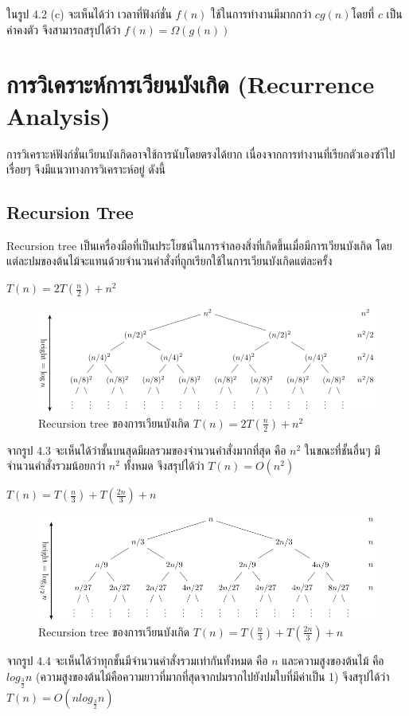 ในรูป 4.2 (c) จะเห็นได้ว่า เวลาที่ฟังก์ชั่น $f(n)$ ใช้ในการทำงานมีมากกว่า $cg(n)$โดยที่ $c$ เป็นค่าคงตัว จึงสามารถสรุปได้ว่า $f(n)=\Omega(g(n))$

\section{การวิเคราะห์การเวียนบังเกิด (Recurrence Analysis)}

การวิเคราะห์ฟังก์ชั่นเวียนบังเกิดอาจใช้การนับโดยตรงได้ยาก เนื่องจากการทำงานที่เรียกตัวเองซำ้ไปเรื่อยๆ จึงมีแนวทางการวิเคราะห์อยู่ ดังนี้

\subsection{Recursion Tree}

Recursion tree เป็นเครื่องมือที่เป็นประโยชน์ในการจำลองสิ่งที่เกิดขึ้นเมื่อมีการเวียนบังเกิด โดยแต่ละปมของต้นไม้จะแทนด้วยจำนวนคำสั่งที่ถูกเรียกใช้ในการเวียนบังเกิดแต่ละครั้ง

\begin{example}
$T(n)=2T(\frac{n}{2}) + n^2$

\begin{figure}[h!]
    \centering
    \includegraphics[width=13cm]{images/tree-2-2-2}
    \caption{Recursion tree ของการเวียนบังเกิด $T(n)=2T(\frac{n}{2}) + n^2$ }
    \label{fig:tree-2-2-2}
\end{figure}
จากรูป 4.3 จะเห็นได้ว่าชั้นบนสุดมีผลรวมของจำนวนคำสั่งมากที่สุด คือ $n^2$ ในขณะที่ชั้นอื่นๆ มีจำนวนคำสั่งรวมน้อยกว่า $n^2$ ทั้งหมด จึงสรุปได้ว่า $T(n)=O(n^2)$
\end{example}

\begin{example}
$T(n)=T(\frac{n}{3}) + T(\frac{2n}{3}) + n$

\begin{figure}[h!]
    \centering
    \includegraphics[width=13cm]{images/tree-1-3-2_3-1}
    \caption{Recursion tree ของการเวียนบังเกิด $T(n)=T(\frac{n}{3}) + T(\frac{2n}{3}) + n$ }
    \label{fig:tree-1-3-2-_3-1}
\end{figure}
จากรูป 4.4 จะเห็นได้ว่าทุกชั้นมีจำนวนคำสั่งรวมเท่ากันทั้งหมด คือ $n$ และความสูงของต้นไม้ คือ $log_{\frac{3}{2}} n$ (ความสูงของต้นไม้คือความยาวที่มากที่สุดจากปมรากไปยังปมใบที่มีค่าเป็น 1) จึงสรุปได้ว่า $T(n)=O(nlog_{\frac{3}{2}}n)$
\end{example}

